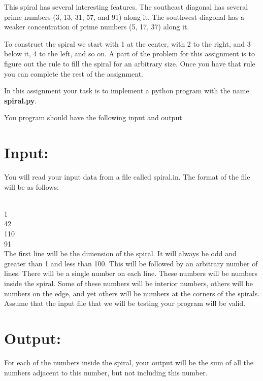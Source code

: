 \documentclass[12pt]{article}
\begin{document}
This spiral has several interesting features. The southeast diagonal has several prime numbers (3, 13, 31, 57, and 91) along it. 
The southwest diagonal has a weaker concentration of prime numbers (5, 17, 37) along it.

To construct the spiral we start with 1 at the center, with 2 to the right, and 3 below it, 4 to the left, and so on. 
A part of the problem for this assignment is to figure out the 
rule to fill the spiral for an arbitrary size. Once you have that rule you can complete the rest of the assignment.



In this assignment your task is to implement a python program with the name \textbf{spiral.py}. 

\newpage 

You program should have the following input and output 

\section*{Input:}

You will read your input data from a file called spiral.in. The format of the file will be as follows:

\vspace{1cm}

 \\
1 \\
42 \\ 
110 \\ 
91 \\

The first line will be the dimension of the spiral. It will always be odd and greater than 1 and less than 100. 
This will be followed by an arbitrary number of lines. There will be a single number on each line. These numbers will be numbers inside the spiral. 
Some of these numbers will be interior numbers, others will be numbers 
on the edge, and yet others will be numbers at the corners of the spirals. Assume that the input file that we will be testing your program will be valid.




\section*{Output:}


For each of the numbers inside the spiral, your output will be the sum of all the numbers adjacent to this number, but not including this number. 
\end{document}
